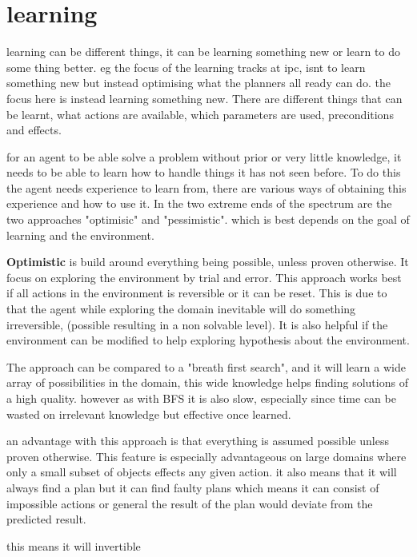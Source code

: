 \section{learning}
learning can be different things, it can be learning something new or learn to do some thing better. eg the focus of the learning tracks at ipc, isnt to learn something new but instead optimising what the planners all ready can do. the focus here is instead learning something new. There are different things that can be learnt, what actions are available, which parameters are used, preconditions and effects.



 

	for an agent to be able solve a problem without prior or very little knowledge, it needs to be able to learn how to handle things it has not seen before. To do this the agent needs experience to learn from, there are various ways of obtaining this experience and how to use it. In the two extreme ends of the spectrum are the two approaches "optimisic" and "pessimistic". which is best depends on the goal of learning and the environment.

	
	\textbf{Optimistic} is build around everything being possible, unless proven otherwise. It focus on exploring the environment by trial and error. This approach works best if all actions in the environment is reversible or it can be reset. This is due to that the agent while exploring the domain inevitable will do something irreversible, (possible resulting in a non solvable level). It is also helpful if the environment can be modified to help exploring hypothesis about the environment.
		
	The approach can be compared to a "breath first search", and it will learn a wide array of possibilities in the domain, this wide knowledge helps finding solutions of a high quality. however as with BFS it is also slow, especially since time can be wasted on irrelevant knowledge but effective once learned.


		an advantage with this approach is that everything is assumed possible unless proven otherwise. This feature is especially advantageous on large domains where only a small subset of objects effects any given action. it also means that it will always find a plan but it can find faulty plans which means it can consist of impossible actions or general the result of the plan would deviate from the predicted result. 
		
		this means it will invertible 
				
